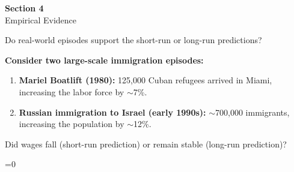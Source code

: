 \documentclass{beamer}
\newcommand{\showanswers}{1}  %
\begin{document}
\begin{frame}

\vspace{2cm}

\centering
{\LARGE \textbf{Section 4}} \\[0.5cm]
{\Large Empirical Evidence}

\vfill

\end{frame}



\begin{frame}{Do real-world episodes support the short-run or long-run predictions?}

\textbf{Consider two large-scale immigration episodes:}

\vspace{0.3cm}

\begin{enumerate}
    \item \textbf{Mariel Boatlift (1980):} 125,000 Cuban refugees arrived in Miami, increasing the labor force by $\sim$7\%.

    \vspace{0.2cm}

    \item \textbf{Russian immigration to Israel (early 1990s):} $\sim$700,000 immigrants, increasing the population by $\sim$12\%.
\end{enumerate}

\vspace{0.3cm}

Did wages fall (short-run prediction) or remain stable (long-run prediction)?

\end{frame}



\ifnum\showanswers=0
\end{document}
